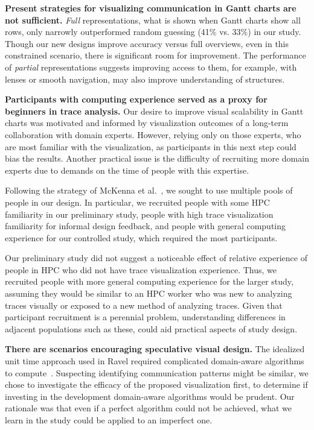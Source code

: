 \vspace{1ex}

\textbf{Present strategies for visualizing communication in Gantt charts are not sufficient.} {\em Full} representations, what is shown when Gantt charts show all rows, only narrowly outperformed random guessing (41\% vs. 33\%) in our study. Though our new designs improve accuracy versus full overviews, even in this constrained scenario, there is significant room for improvement. The performance of {\em partial} representations suggests improving access to them, for example, with lenses or smooth navigation, may also improve understanding of structures.

\vspace{1ex}


\textbf{Participants with computing experience served as a proxy for beginners in trace analysis.} Our desire to improve visual scalability in Gantt charts was motivated and informed by visualization outcomes of a long-term collaboration with domain experts. However, relying only on those experts, who are most familiar with the visualization, as participants in this next step could bias the results. Another practical issue is the difficulty of recruiting more domain experts due to demands on the time of people with this expertise. 

Following the strategy of McKenna et al.~\cite{McKenna2016}, we sought to use multiple pools of people in our design. In particular, we recruited people with some HPC familiarity in our preliminary study, people with high trace visualization familiarity for informal design feedback, and people with general computing experience for our controlled study, which required the most participants.

Our preliminary study did not suggest a noticeable effect of relative experience of people in HPC who did not have trace visualization experience. Thus, we recruited people with more general computing experience for the larger study, assuming they would be similar to an HPC worker who was new to analyzing traces visually or exposed to a new method of analyzing traces. Given that participant recruitment is a perennial problem, understanding differences in adjacent populations such as these, could aid practical aspects of study design. 

\vspace{1ex}

\textbf{There are scenarios encouraging speculative visual design.} The idealized unit time approach used in Ravel required complicated domain-aware algorithms to compute~\cite{Isaacs2015,Isaacs2016}. Suspecting identifying communication patterns might be similar, we chose to investigate the efficacy of the proposed visualization first, to determine if investing in the development domain-aware algorithms would be prudent. Our rationale was that even if a perfect algorithm could not be achieved, what we learn in the study could be applied to an imperfect one. 


